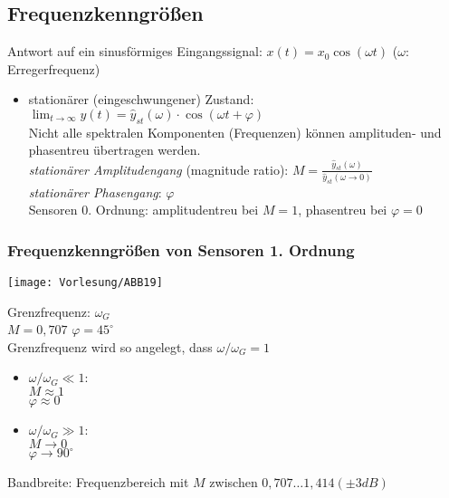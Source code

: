 \documentclass{scrreprt}
\begin{document}
\subsection{Frequenzkenngrößen}
Antwort auf ein sinusförmiges Eingangssignal: $x(t) = x_0 \cos (\omega t)$ \quad ($\omega$: Erregerfrequenz)
\begin{itemize}
\item stationärer (eingeschwungener) Zustand: $\lim_{t\to \infty} y(t) = \hat{y}_{st}(\omega) \cdot \cos (\omega t + \varphi)$\\
Nicht alle spektralen Komponenten (Frequenzen) können amplituden- und phasentreu übertragen werden.\\
\emph{stationärer Amplitudengang} (magnitude ratio): $M=\frac{\hat{y}_{st}(\omega)}{\hat{y}_{st} (\omega \to 0)}$\\
\emph{stationärer Phasengang}: $\varphi$\\
Sensoren 0. Ordnung: amplitudentreu bei $M=1$, phasentreu bei $\varphi = 0$
\end{itemize}
\subsubsection{Frequenzkenngrößen von Sensoren 1. Ordnung}
\begin{center}
\texttt{[image: Vorlesung/ABB19]}
\end{center}
Grenzfrequenz: $\omega_G$\\
$M=0,707$ \quad $\varphi=45^\circ$\\
Grenzfrequenz wird so angelegt, dass $\omega/\omega_G=1$
\begin{itemize}
\item $\omega/\omega_G \ll 1$:\\
$M \approx 1$\\
$\varphi \approx 0$
\item $\omega / \omega_G \gg 1$:\\
$M \to 0$\\
$\varphi \to 90^\circ$
\end{itemize}
Bandbreite: Frequenzbereich mit $M$ zwischen $0,707\dots 1,414 (\pm 3dB)$
\end{document}
